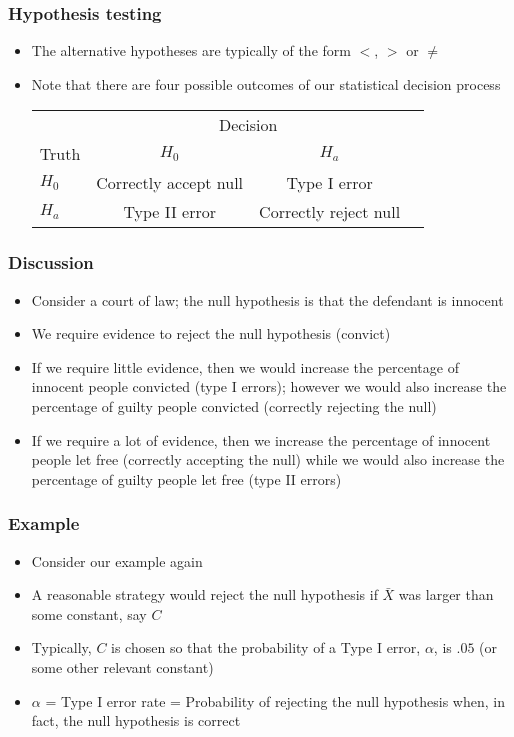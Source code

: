 \documentclass[aspectratio=169]{beamer}
\begin{document}
\begin{frame}\frametitle{Hypothesis testing}
\begin{itemize}
\item The alternative hypotheses are typically of the form $<$, $>$ or $\neq$
\item Note that there are four possible outcomes of our statistical decision
  process
\begin{center}
  \begin{tabular}{lccc}
      & \multicolumn{2}{c}{Decision} \\
Truth & $H_0$ & $H_a$ \\ \hline
$H_0$ & Correctly accept null & Type I error \\
$H_a$ & Type II error & Correctly reject null  \\ \hline
  \end{tabular}
\end{center}
\end{itemize}
\end{frame}

\begin{frame}\frametitle{Discussion}
\begin{itemize}
\item Consider a court of law; the null hypothesis is that the
  defendant is innocent
\item We require evidence to reject the null hypothesis (convict)
\item If we require little evidence, then we would increase the
  percentage of innocent people convicted (type I errors); however we
  would also increase the percentage of guilty people convicted
  (correctly rejecting the null)
\item If we require a lot of evidence, then we increase the
  percentage of innocent people let free (correctly accepting the
  null) while we would also increase the percentage of guilty people
  let free (type II errors)
\end{itemize}
\end{frame}

\begin{frame}\frametitle{Example}
\begin{itemize}
\item Consider our example again
\item A reasonable strategy would reject the null hypothesis if
  $\bar X$ was larger than some constant, say $C$
\item Typically, $C$ is chosen so that the probability of a Type I
  error, $\alpha$, is $.05$ (or some other relevant constant)
\item $\alpha$ = Type I error rate = Probability of rejecting the null hypothesis
  when, in fact, the null hypothesis is correct
\end{itemize}
\end{frame}
\end{document}
